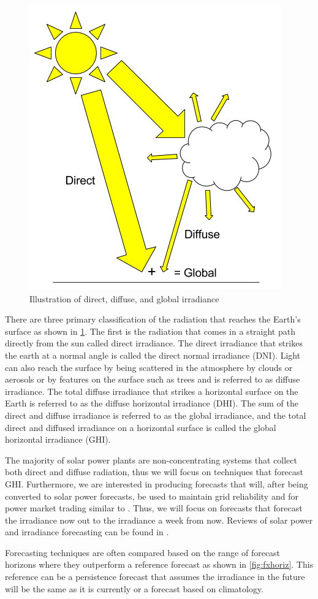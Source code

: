 \begin{figure}[htb]
\centering
\includegraphics[width=.5\textwidth]{figs/comp_of_irr.png}
\caption{Illustration of direct, diffuse, and global irradiance}
\label{fig:irradiance_components}
\end{figure}

There are three primary classification of the radiation that reaches
the Earth's surface as shown in \cref{fig:irradiance_components}.
The first is the radiation that comes in a straight path directly from
the sun called direct irradiance.
The direct irradiance that strikes the earth at a normal angle is
called the direct normal irradiance (DNI).
Light can also reach the surface by being scattered in the atmosphere
by clouds or aerosols or by features on the surface such as trees and
is referred to as diffuse irradiance.
The total diffuse irradiance that strikes a horizontal surface on the
Earth is referred to as the diffuse horizontal irradiance (DHI).
The sum of the direct and diffuse irradiance is referred to as the
global irradiance, and the total direct and diffused irradiance on a
horizontal surface is called the global horizontal irradiance (GHI).

The majority of solar power plants are non-concentrating systems that
collect both direct and diffuse radiation, thus we will focus on
techniques that forecast GHI.
Furthermore, we are interested in producing forecasts that will,
after being converted to solar power forecasts, be used to maintain
grid reliability and for power market trading similar to
\cite{Kaur2016}.
Thus, we will focus on forecasts that forecast the irradiance now out
to the irradiance a week from now.
Reviews of solar power and irradiance forecasting can be found in
\citep{Inman2013,Antonanzas2016}.

Forecasting techniques are often compared based on the range of
forecast horizons where they outperform a reference forecast as shown
in \cref{fig:fxhoriz}.
This reference can be a persistence forecast that assumes the
irradiance in the future will be the same as it is currently or a
forecast based on climatology.

